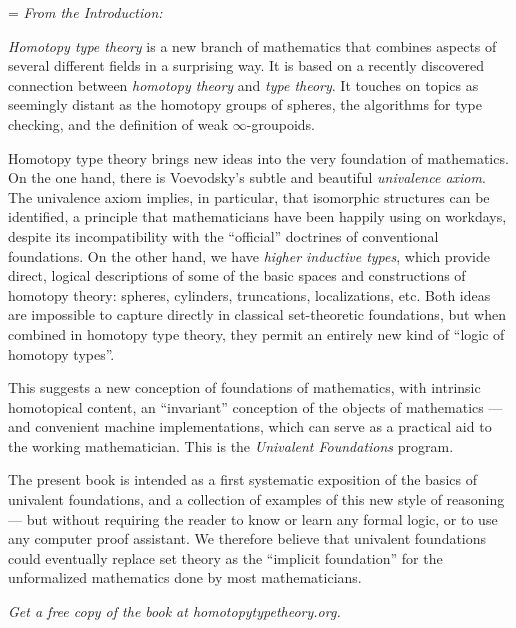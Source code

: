 \pagestyle{empty}

\cleardoublepage
\clearpage

%
\vspace*{0.01\textheight}
{\large
\raggedright
\parindent=0pt
\parskip=\baselineskip
\emph{\LARGE From the Introduction:}

\emph{Homotopy type theory} is a new branch of mathematics that combines aspects of several different fields in a surprising way. It is based on a recently discovered connection between \emph{homotopy theory} and \emph{type theory}.
It touches on topics as seemingly distant as the homotopy groups of spheres, the algorithms for type checking, and the definition of weak $\infty$-groupoids.

Homotopy type theory brings new ideas into the very foundation of mathematics.
On the one hand, there is Voevodsky's subtle and beautiful \emph{univalence axiom}.
The univalence axiom implies, in particular, that isomorphic structures can be identified, a principle that mathematicians have been happily using on workdays, despite its incompatibility with the ``official'' doctrines of conventional foundations.
On the other hand, we have \emph{higher inductive types}, which provide direct, logical descriptions of some of the basic spaces and constructions of homotopy theory: spheres, cylinders, truncations, localizations, etc.
Both ideas are impossible to capture directly in classical set-theoretic foundations, but when combined in homotopy type theory, they permit an entirely new kind of ``logic of homotopy types''.

This suggests a new conception of foundations of mathematics, with intrinsic homotopical content, an ``invariant'' conception of the objects of mathematics --- and convenient machine implementations, which can serve as a practical aid to the working mathematician.
This is the \emph{Univalent Foundations} program.

The present book is intended as a first systematic exposition of the basics of univalent foundations, and a collection of examples of this new style of reasoning --- but without requiring the reader to know or learn any formal logic, or to use any computer proof assistant.
We therefore believe that univalent foundations could eventually replace set theory as the ``implicit foundation'' for the unformalized mathematics done by most mathematicians.

\bigskip

\begin{center}
  \LARGE
  \emph{Get a free copy of the book at homotopytypetheory.org.}
\end{center}
}
\vspace*{0.02\textheight}

